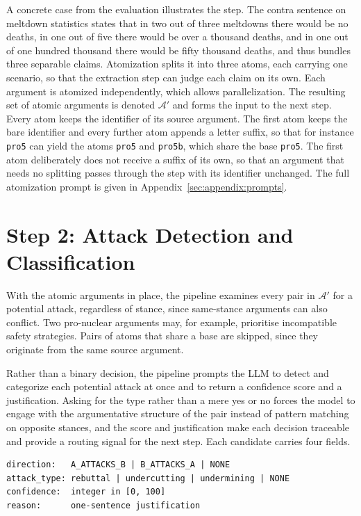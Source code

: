A concrete case from the evaluation illustrates the step. The contra sentence
on meltdown statistics states that in two out of three meltdowns there would
be no deaths, in one out of five there would be over a thousand deaths, and in
one out of one hundred thousand there would be fifty thousand deaths, and thus
bundles three separable claims. Atomization splits it into three atoms, each
carrying one scenario, so that the extraction step can judge each claim on its
own. Each argument is atomized independently, which allows
parallelization. The resulting set of atomic arguments is denoted
$\mathcal{A}'$ and forms the input to the next step. Every atom keeps the
identifier of its source argument. The first atom keeps the bare identifier
and every further atom appends a letter suffix, so that for instance
\texttt{pro5} can yield the atoms \texttt{pro5} and \texttt{pro5b}, which share
the base \texttt{pro5}. The first atom deliberately does not receive a suffix
of its own, so that an argument that needs no splitting passes through the
step with its identifier unchanged. The full atomization prompt is given in
Appendix~\ref{sec:appendix:prompts}.

\section{Step 2: Attack Detection and Classification}
\label{sec:method:extraction}

With the atomic arguments in place, the pipeline examines every pair in
$\mathcal{A}'$ for a potential attack, regardless of stance, since same-stance
arguments can also conflict. Two pro-nuclear arguments may, for example,
prioritise incompatible safety strategies. Pairs of atoms that share a base are
skipped, since they originate from the same source argument.

Rather than a binary decision, the pipeline prompts the LLM to detect and
categorize each potential attack at once and to return a confidence score and a
justification. Asking for the type rather than a mere yes or no forces the model
to engage with the argumentative structure of the pair instead of pattern
matching on opposite stances, and the score and justification make each decision
traceable and provide a routing signal for the next step. Each candidate carries
four fields.

\begin{lstlisting}[basicstyle=\ttfamily\footnotesize]
direction:   A_ATTACKS_B | B_ATTACKS_A | NONE
attack_type: rebuttal | undercutting | undermining | NONE
confidence:  integer in [0, 100]
reason:      one-sentence justification
\end{lstlisting}

